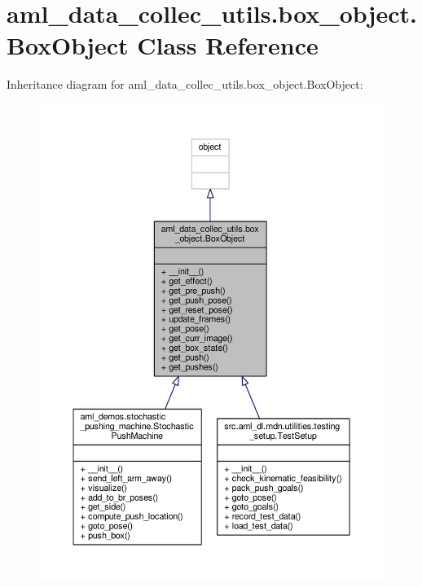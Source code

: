 \hypertarget{classaml__data__collec__utils_1_1box__object_1_1_box_object}{\section{aml\-\_\-data\-\_\-collec\-\_\-utils.\-box\-\_\-object.\-Box\-Object Class Reference}
\label{classaml__data__collec__utils_1_1box__object_1_1_box_object}
}


Inheritance diagram for aml\-\_\-data\-\_\-collec\-\_\-utils.\-box\-\_\-object.\-Box\-Object\-:\nopagebreak
\begin{figure}[H]
\begin{center}
\leavevmode
\includegraphics[width=350pt]{classaml__data__collec__utils_1_1box__object_1_1_box_object__inherit__graph}
\end{center}
\end{figure}



